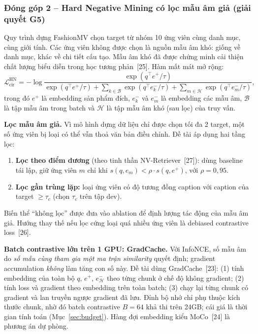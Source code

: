 \documentclass[a4paper]{article}
\begin{document}
\subsubsection{Đóng góp 2 -- Hard Negative Mining có lọc mẫu âm giả (giải quyết G5)}\label{sec:hn}

Quy trình dựng FashionMV chọn target từ nhóm 10 ứng viên cùng danh mục, cùng giới tính. Các ứng viên không được chọn là nguồn mẫu âm khó: giống về danh mục, khác về chi tiết cấu tạo. Mẫu âm khó đã được chứng minh cải thiện chất lượng biểu diễn trong học tương phản~[25]. Hàm mất mát mở rộng:
\[
\mathcal{L}^{\text{HN}}_{\text{cir}} = -\log\frac{\exp(q^\top e^{+}/\tau)}{\exp(q^\top e^{+}/\tau) + \sum_{k\in\mathcal{B}}\exp(q^\top e^{-}_{k}/\tau) + \sum_{m\in\mathcal{H}}\exp(q^\top e^{-}_{m}/\tau)},
\]
trong đó $e^{+}$ là embedding sản phẩm đích, $e^{-}_{k}$ và $e^{-}_{m}$ là embedding các mẫu âm, $\mathcal{B}$ là tập mẫu âm trong batch và $\mathcal{H}$ là tập mẫu âm khó (sau lọc) của truy vấn.

\textbf{Lọc mẫu âm giả.} Vì mô hình dựng dữ liệu chỉ được chọn tối đa 2 target, một số ứng viên bị loại có thể vẫn thoả văn bản điều chỉnh. Đề tài áp dụng hai tầng lọc:
\begin{enumerate}[label=(F\arabic*)]
\item \textbf{Lọc theo điểm dương} (theo tinh thần NV-Retriever~[27]): dùng baseline tái lập, giữ ứng viên $m$ chỉ khi $s(q, e_m) < \rho \cdot s(q, e^{+})$, với $\rho = 0{,}95$.
\item \textbf{Lọc gần trùng lặp:} loại ứng viên có độ tương đồng caption với caption của target $\geq \tau_c$ (chọn $\tau_c$ trên tập dev).
\end{enumerate}
Biến thể ``không lọc'' được đưa vào ablation để định lượng tác động của mẫu âm giả. Hướng thay thế nếu lọc cứng loại quá nhiều ứng viên là debiased contrastive loss~[26].

\textbf{Batch contrastive lớn trên 1 GPU: GradCache.} Với InfoNCE, số mẫu âm do \textit{số mẫu cùng tham gia một ma trận similarity} quyết định; gradient accumulation \textit{không} làm tăng con số này. Đề tài dùng GradCache~[23]: (1) tính embedding của toàn bộ $q$, $e^{+}$, $e^{-}_{\mathcal{H}}$ theo từng chunk ở chế độ không gradient; (2) tính loss và gradient theo embedding trên toàn batch; (3) chạy lại từng chunk có gradient và lan truyền ngược gradient đã lưu. Đỉnh bộ nhớ chỉ phụ thuộc kích thước chunk, nhờ đó batch contrastive $B=64$ khả thi trên 24GB; cái giá là thời gian tính toán (Mục~\ref{sec:budget}). Hàng đợi embedding kiểu MoCo~[24] là phương án dự phòng.
\end{document}
